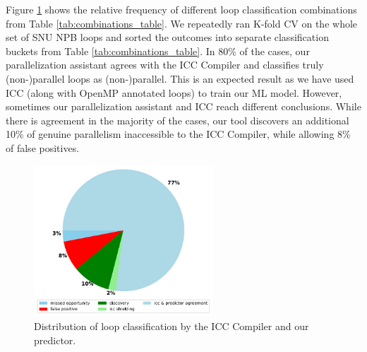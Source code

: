 Figure \ref{fig:icc_competition} shows the relative frequency of different loop classification combinations from Table \ref{tab:combinations_table}. We repeatedly ran K-fold CV on the whole set of SNU NPB loops and sorted the outcomes into separate classification buckets from Table \ref{tab:combinations_table}. In 80\% of the cases, our parallelization assistant agrees with the ICC Compiler and classifies truly (non-)parallel loops as (non-)parallel. This is an expected result as we have used ICC (along with OpenMP annotated loops) to train our ML model. However, sometimes our parallelization assistant and ICC reach different conclusions. While there is agreement in the majority of the cases, our tool discovers an additional 10\% of genuine parallelism inaccessible to the ICC Compiler, while allowing 8\% of false positives.

\begin{figure}[t!]
    \centering
    \includegraphics[width=0.6\textwidth]{images/pie.pdf}
    \caption{
      Distribution of loop classification by the ICC Compiler and our predictor.}
    \label{fig:icc_competition}
\vspace*{-5mm}
\end{figure}

